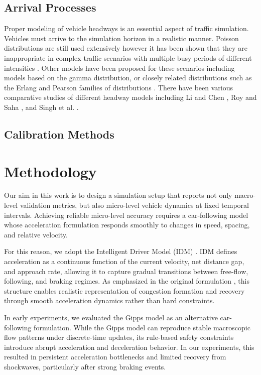 \documentclass{scspaperproc}
\theoremstyle{scsthe}
\begin{document}
    \subsection{Arrival Processes}

    Proper modeling of vehicle headways is an essential aspect of traffic simulation.
    Vehicles must arrive to the simulation horizon in a realistic manner.
    Poisson distributions are still used extensively however it has been shown that they are inappropriate in complex traffic scenarios with multiple busy periods of different intensities \cite{meng2009self}.
    Other models have been proposed for these scenarios including models based on the gamma distribution, or closely related distributions such as the Erlang and Pearson families of distributions \cite{li2017vehicle}.
    There have been various comparative studies of different headway models including Li and Chen \cite{li2017vehicle}, Roy and Saha \cite{roy2018headway}, and Singh et al. \cite{singh2020multivariate}.

    \subsection{Calibration Methods}

    \section{Methodology}
    \label{sec:methodology}
    Our aim in this work is to design a simulation setup that reports not only macro-level validation metrics, but also micro-level vehicle dynamics at fixed temporal intervals. Achieving reliable micro-level accuracy requires
    a car-following model whose acceleration formulation responds smoothly to changes in speed, spacing, and relative velocity.

    For this reason, we adopt the Intelligent Driver Model (IDM) \cite{treiber2000congested}. IDM defines acceleration as a continuous function of the current velocity, net distance gap, and approach rate, allowing it to capture gradual transitions between free-flow, following, and braking regimes. As emphasized in the original formulation \cite{treiber2000congested}, this structure enables realistic representation of congestion formation and recovery through smooth acceleration dynamics rather than hard constraints.

    In early experiments, we evaluated the Gipps model \cite{gipps1981behavioural} as an alternative car-following formulation. While the Gipps model can reproduce stable macroscopic flow patterns under discrete-time updates, its rule-based safety constraints introduce abrupt acceleration and deceleration behavior. In our experiments, this resulted in persistent acceleration bottlenecks and limited recovery from shockwaves, particularly after strong braking events.
\end{document}
